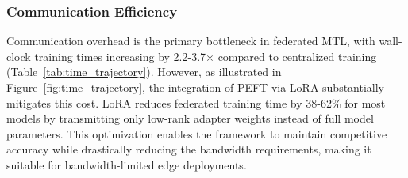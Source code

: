 \subsubsection{Communication Efficiency}
Communication overhead is the primary bottleneck in federated MTL, with wall-clock training times increasing by 2.2-3.7$\times$ compared to centralized training (Table~\ref{tab:time_trajectory}). However, as illustrated in Figure~\ref{fig:time_trajectory}, the integration of PEFT via LoRA \cite{hu2021lora} substantially mitigates this cost. LoRA reduces federated training time by 38-62\% for most models by transmitting only low-rank adapter weights instead of full model parameters. This optimization enables the framework to maintain competitive accuracy while drastically reducing the bandwidth requirements, making it suitable for bandwidth-limited edge deployments.




